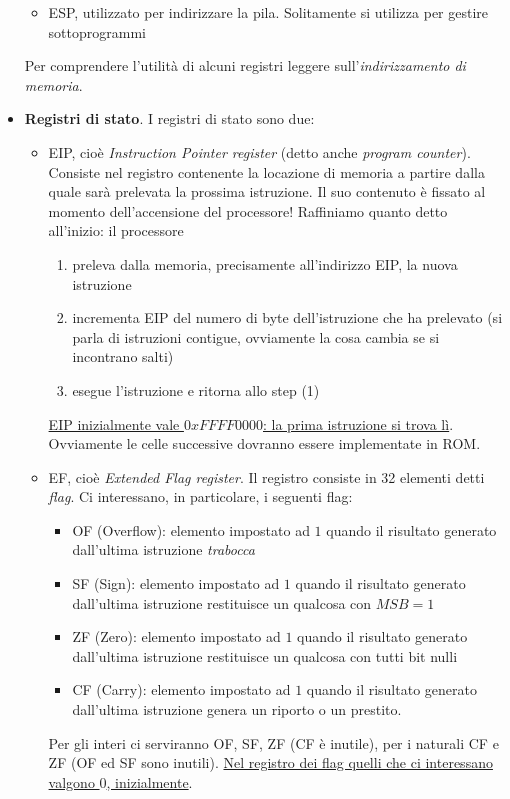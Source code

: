 \documentclass[11pt]{report}
\begin{document}
\begin{itemize}
\begin{itemize}
\item ESP, utilizzato per indirizzare la pila. Solitamente si utilizza per gestire sottoprogrammi
\end{itemize}
Per comprendere l'utilità di alcuni registri leggere sull'\emph{indirizzamento di memoria}.
\item \textbf{Registri di stato}. I registri di stato sono due:
\begin{itemize}
\item EIP, cioè \emph{Instruction Pointer register} (detto anche \emph{program counter}). Consiste nel registro contenente la locazione di memoria a partire dalla quale sarà prelevata la prossima istruzione. Il suo contenuto è fissato al momento dell'accensione del processore! Raffiniamo quanto detto all'inizio: il processore
\begin{enumerate}
\item preleva dalla memoria, precisamente all'indirizzo EIP, la nuova istruzione
\item incrementa EIP del numero di byte dell'istruzione che ha prelevato (si parla di istruzioni contigue, ovviamente la cosa cambia se si incontrano salti)
\item esegue l'istruzione e ritorna allo step (1)
\end{enumerate}
\underline{EIP inizialmente vale $0xFFFF0000$: la prima istruzione si trova lì}. Ovviamente le celle successive dovranno essere implementate in ROM.\\

\item EF, cioè \emph{Extended Flag register}. Il registro consiste in 32 elementi detti \emph{flag}. Ci interessano, in particolare, i seguenti flag:
\begin{itemize}
\item OF (Overflow): elemento impostato ad $1$ quando il risultato generato dall'ultima istruzione \emph{trabocca}
\item SF (Sign): elemento impostato ad $1$ quando il risultato generato dall'ultima istruzione restituisce un qualcosa con $MSB=1$
\item ZF (Zero): elemento impostato ad $1$ quando il risultato generato dall'ultima istruzione restituisce un qualcosa con tutti bit nulli
\item CF (Carry): elemento impostato ad $1$ quando il risultato generato dall'ultima istruzione genera un riporto o un prestito.
\end{itemize}
Per gli interi ci serviranno OF, SF, ZF (CF è inutile), per i naturali CF e ZF (OF ed SF sono inutili). \underline{Nel registro dei flag quelli che ci interessano valgono $0$, inizialmente}.
\end{itemize}
\end{itemize}
\end{document}
